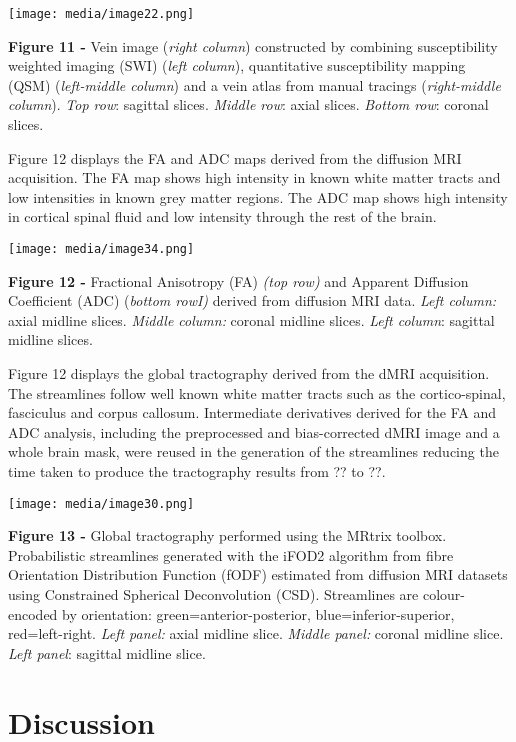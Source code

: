 \texttt{[image: media/image22.png]}

\textbf{Figure 11 -} Vein image (\emph{right column}) constructed by
combining susceptibility weighted imaging (SWI) (\emph{left column}),
quantitative susceptibility mapping (QSM) (\emph{left-middle column})
and a vein atlas from manual tracings (\emph{right-middle column}).
\emph{Top row}: sagittal slices. \emph{Middle row}: axial slices.
\emph{Bottom row}: coronal slices.

Figure 12 displays the FA and ADC maps derived from the diffusion MRI
acquisition. The FA map shows high intensity in known white matter
tracts and low intensities in known grey matter regions. The ADC map
shows high intensity in cortical spinal fluid and low intensity through
the rest of the brain.

\texttt{[image: media/image34.png]}

\textbf{Figure 12 -} Fractional Anisotropy (FA) \emph{(top row)} and
Apparent Diffusion Coefficient (ADC) (\emph{bottom rowI)} derived from
diffusion MRI data. \emph{Left column:} axial midline slices.
\emph{Middle column:} coronal midline slices. \emph{Left column}:
sagittal midline slices.

Figure 12 displays the global tractography derived from the dMRI
acquisition. The streamlines follow well known white matter tracts such
as the cortico-spinal, fasciculus and corpus callosum. Intermediate
derivatives derived for the FA and ADC analysis, including the
preprocessed and bias-corrected dMRI image and a whole brain mask, were
reused in the generation of the streamlines reducing the time taken to
produce the tractography results from ?? to ??.

\texttt{[image: media/image30.png]}

\textbf{Figure 13 -} Global tractography performed using the MRtrix
toolbox. Probabilistic streamlines generated with the iFOD2 algorithm
from fibre Orientation Distribution Function (fODF) estimated from
diffusion MRI datasets using Constrained Spherical Deconvolution (CSD).
Streamlines are colour-encoded by orientation: green=anterior-posterior,
blue=inferior-superior, red=left-right. \emph{Left panel:} axial midline
slice. \emph{Middle panel:} coronal midline slice. \emph{Left panel}:
sagittal midline slice.

\hypertarget{discussion}{%
\section{Discussion}\label{discussion}}

